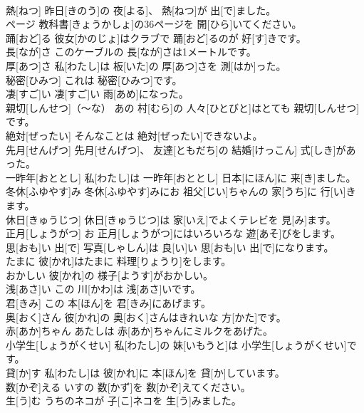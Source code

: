 \documentclass[8pt]{extreport}
\begin{document}
\begin{CJK}{UTF8}{min}
\\	熱[ねつ]	昨日[きのう]の 夜[よる]、 熱[ねつ]が 出[で]ました。		
\\	ページ	教科書[きょうかしょ]の36ページを 開[ひら]いてください。		
\\	踊[おど]る	彼女[かのじょ]はクラブで 踊[おど]るのが 好[す]きです。		
\\	長[なが]さ	このケーブルの 長[なが]さは1メートルです。		
\\	厚[あつ]さ	私[わたし]は 板[いた]の 厚[あつ]さを 測[はか]った。		
\\	秘密[ひみつ]	これは 秘密[ひみつ]です。		
\\	凄[すご]い	凄[すご]い 雨[あめ]になった。		
\\	親切[しんせつ]（～な）	あの 村[むら]の 人々[ひとびと]はとても 親切[しんせつ]です。		
\\	絶対[ぜったい]	そんなことは 絶対[ぜったい]できないよ。		
\\	先月[せんげつ]	先月[せんげつ]、 友達[ともだち]の 結婚[けっこん] 式[しき]があった。		
\\	一昨年[おととし]	私[わたし]は 一昨年[おととし] 日本[にほん]に 来[き]ました。		
\\	冬休[ふゆやす]み	冬休[ふゆやす]みにお 祖父[じい]ちゃんの 家[うち]に 行[い]きます。		
\\	休日[きゅうじつ]	休日[きゅうじつ]は 家[いえ]でよくテレビを 見[み]ます。		
\\	正月[しょうがつ]	お 正月[しょうがつ]にはいろいろな 遊[あそ]びをします。		
\\	思[おも]い 出[で]	写真[しゃしん]は 良[い]い 思[おも]い 出[で]になります。		
\\	たまに	彼[かれ]はたまに 料理[りょうり]をします。		
\\	おかしい	彼[かれ]の 様子[ようす]がおかしい。		
\\	浅[あさ]い	この 川[かわ]は 浅[あさ]いです。		
\\	君[きみ]	この 本[ほん]を 君[きみ]にあげます。		
\\	奥[おく]さん	彼[かれ]の 奥[おく]さんはきれいな 方[かた]です。		
\\	赤[あか]ちゃん	あたしは 赤[あか]ちゃんにミルクをあげた。		
\\	小学生[しょうがくせい]	私[わたし]の 妹[いもうと]は 小学生[しょうがくせい]です。		
\\	貸[か]す	私[わたし]は 彼[かれ]に 本[ほん]を 貸[か]しています。		
\\	数[かぞ]える	いすの 数[かず]を 数[かぞ]えてください。		
\\	生[う]む	うちのネコが 子[こ]ネコを 生[う]みました。		

\end{CJK}
\end{document}
